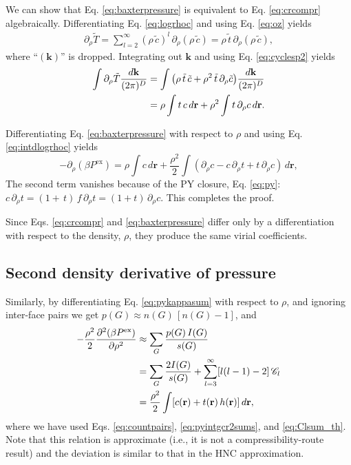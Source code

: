 \documentclass[preprint]{revtex4-1}
\newcommand{\vct}[1]{\mathbf{#1}}
\providecommand{\vr}{} %
\renewcommand{\vr}{\vct{r}}
\newcommand{\vk}{\vct{k}}
\newcommand{\dvk}{\frac{d\vk}{(2\pi)^D}}
\newcommand{\supex}[1]{ { { #1 }^{ \mathrm{ex} } } }
\newcommand{\Pex}{\supex{P}}
\newcommand{\Chn}{\mathscr{C}}
\begin{document}
We can show that
  Eq. \eqref{eq:baxterpressure} is equivalent to Eq. \eqref{eq:crcompr}
  algebraically\cite{baxterpressure}.
%
Differentiating Eq. \eqref{eq:logrhoc} and using Eq. \eqref{eq:oz} yields
%
\begin{align*}
  \partial_\rho \tilde T
=
  \sum_{l = 2}^{\infty}
    ( \rho \, \tilde{c} )^l
    \, \partial_\rho ( \rho \, \tilde{c} )
=
  \rho \, \tilde{t}
  \, \partial_\rho ( \rho \, \tilde{c} ),
\end{align*}
%
where ``$(\vk)$'' is dropped.
%
Integrating out $\vk$ and using Eq. \eqref{eq:cyclesp2} yields
%
\begin{align}
  \int \partial_\rho \tilde T \dvk
&=
  \int
    \big(
      \rho \, \tilde{t} \, \tilde{c}
      +
      \rho^2 \, \tilde{t} \, \partial_\rho \tilde{c}
    \big) \dvk
\notag \\
&=
  \rho \int t \, c \, d\vr
      +
  \rho^2 \int t \, \partial_\rho c \, d\vr.
\label{eq:intdlogrhoc}
\end{align}



Differentiating Eq. \eqref{eq:baxterpressure}
with respect to $\rho$ and using Eq. \eqref{eq:intdlogrhoc} yields
%
\[
  -\partial_\rho ( \beta \Pex )
=
  \rho \int c \, d\vr
  + \frac{\rho^2}{2} \int (
    \partial_\rho c - c \, \partial_\rho t + t \, \partial_\rho c
    ) \, d\vr,
\]
The second term vanishes because of the PY closure, Eq. \eqref{eq:py}:
$c \, \partial_\rho t = (1 + \, t) \, f \, \partial_\rho t = (1 + t) \, \partial_\rho c$.
%
This completes the proof.

Since
Eqs. \eqref{eq:crcompr} and \eqref{eq:baxterpressure}
differ only
by a differentiation with respect to the density, $\rho$,
they produce the same virial coefficients.




\subsection{Second density derivative of pressure}

Similarly,
  by differentiating Eq. \eqref{eq:pykappasum} with respect to $\rho$,
  and ignoring inter-face pairs
  we get
  $p(G) \approx n(G) \, [n(G) - 1]$,
  and
%
\begin{align}
           -\frac{\rho^2}{2}
            \frac{\partial^2 ( \beta \Pex ) }
                 {\partial \rho^2}
  &\approx   \sum_G \frac{ p(G) \, I(G) }{ s(G) }
    \notag \\
  &=
            \sum_G \frac{2 I(G) }{s(G)}
            + \sum_{l = 3}^\infty [l(l-1) - 2] \, \Chn_l
    \notag \\
  &=         \frac{\rho^2}{2} \int [c(\vr) + t(\vr) \, h(\vr) ] \, d\vr,
\label{eq:pyddpressure}
\end{align}
%
where we have used
  Eqs. \eqref{eq:countpairs},
       \eqref{eq:pyintgcr2sums}, and
       \eqref{eq:Clsum_th}.
%
Note that this relation is approximate
  (i.e., it is not a compressibility-route result)
  and the deviation is
  similar to that in the HNC approximation.
\end{document}
